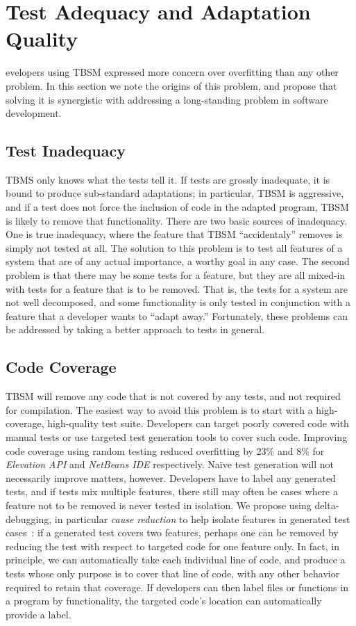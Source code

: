 \section{Test Adequacy and Adaptation Quality}
evelopers using TBSM expressed more concern over overfitting than any other problem.  In this section we note the origins of this problem, and propose that solving it is synergistic with addressing a long-standing problem in software development.

\subsection{Test Inadequacy}

TBMS only knows what the tests tell it.  If tests are grossly inadequate, it is bound to produce sub-standard adaptations; in particular, TBSM is aggressive, and if a test does not force the inclusion of code in the adapted program, TBSM is likely to remove that functionality.  There are two basic sources of inadequacy.  One is true inadequacy, where the feature that TBSM ``accidentaly'' removes is simply not tested at all.  The solution to this problem is to test all features of a system that are of any actual importance, a worthy goal in any case.  The second problem is that there may be some tests for a feature, but they are all mixed-in with tests for a feature that is to be removed.  That is, the tests for a system are not well decomposed, and some functionality is only tested in conjunction with a feature that a developer wants to ``adapt away.''  Fortunately, these problems can be addressed by taking a better approach to tests in general.

\subsection{Code Coverage} 
TBSM will remove any code that is not covered by any tests, and not required for compilation. The easiest way to avoid this problem is to start with a high-coverage, high-quality test suite. Developers can target poorly covered code with manual tests or use targeted test generation tools to cover such code. Improving code coverage using random testing reduced overfitting by 23\% and 8\% for \textit{Elevation API} and \textit{NetBeans IDE} respectively. Na\"ive test generation will not necessarily improve matters, however. Developers have to label any generated tests, and if tests mix multiple features, there still may often be cases where a feature not to be removed is never tested in isolation. We propose using delta-debugging, in particular \emph{cause reduction} to help isolate features in generated test cases~\cite{stvrcausereduce}: if a generated test covers two features, perhaps one can be removed by reducing the test with respect to targeted code for one feature only.  In fact, in principle, we can automatically take each individual line of code, and produce a tests whose only purpose is to cover that line of code, with any other behavior required to retain that coverage.  If developers can then label files or functions in a program by functionality, the targeted code's location can automatically provide a label.

